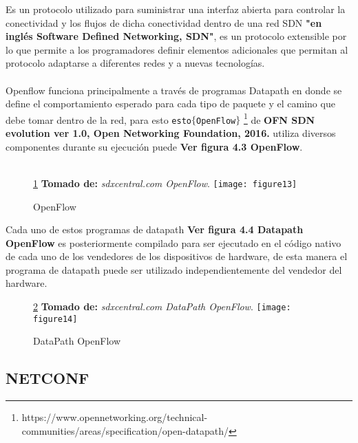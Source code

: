 Es un protocolo utilizado para suministrar una interfaz abierta para controlar la conectividad y los flujos de dicha conectividad dentro de una red SDN \textbf{"en inglés Software Defined Networking, SDN"}, es un protocolo extensible por lo que permite a los programadores definir elementos adicionales que permitan al protocolo adaptarse a diferentes redes y a nuevas tecnologías. 
\\
\\
Openflow funciona principalmente a través de programas Datapath en donde se define el comportamiento esperado para cada tipo de paquete y el camino que debe tomar dentro de la red, para esto \texttt{esto$\{$OpenFlow$\}$} \footnote{https://www.opennetworking.org/technical-communities/areas/specification/open-datapath/} de \textbf{OFN SDN evolution ver 1.0, Open Networking Foundation, 2016.} utiliza diversos componentes durante su ejecución puede \textbf{Ver figura 4.3 OpenFlow}.
\\
\\
\begin{figure}[htbp]
 \ref{fig:OpenFlow} \textbf{Tomado de:} \textit{sdxcentral.com OpenFlow}.
  \centering
    {\texttt{[image: figure13]}}%
  \caption{OpenFlow}
  \label{fig:OpenFlow}
\end{figure}
Cada uno de estos programas de datapath \textbf{Ver figura 4.4 Datapath OpenFlow} es posteriormente compilado para ser ejecutado en el código nativo de cada uno de los vendedores de los dispositivos de hardware, de esta manera el programa de datapath puede ser utilizado independientemente del vendedor del hardware.
\begin{figure}[htbp]
 \ref{fig:DataPath} \textbf{Tomado de:} \textit{sdxcentral.com DataPath OpenFlow}.
  \centering
    {\texttt{[image: figure14]}}%
  \caption{DataPath OpenFlow}
  \label{fig:DataPath}
\end{figure}

\subsection{NETCONF}

